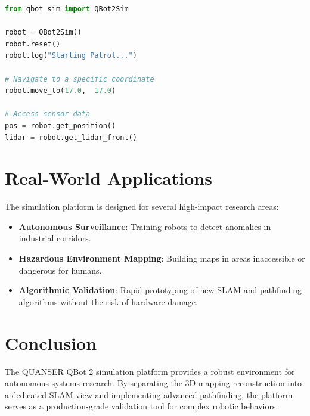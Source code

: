 \documentclass[12pt, a4paper]{article}
\begin{document}
\begin{lstlisting}[language=Python, caption=Sample Control Script]
from qbot_sim import QBot2Sim

robot = QBot2Sim()
robot.reset()
robot.log("Starting Patrol...")

# Navigate to a specific coordinate
robot.move_to(17.0, -17.0) 

# Access sensor data
pos = robot.get_position()
lidar = robot.get_lidar_front()
\end{lstlisting}

\section{Real-World Applications}
The simulation platform is designed for several high-impact research areas:
\begin{itemize}
    \item \textbf{Autonomous Surveillance}: Training robots to detect anomalies in industrial corridors.
    \item \textbf{Hazardous Environment Mapping}: Building maps in areas inaccessible or dangerous for humans.
    \item \textbf{Algorithmic Validation}: Rapid prototyping of new SLAM and pathfinding algorithms without the risk of hardware damage.
\end{itemize}

\section{Conclusion}
The QUANSER QBot 2 simulation platform provides a robust environment for autonomous systems research. By separating the 3D mapping reconstruction into a dedicated SLAM view and implementing advanced pathfinding, the platform serves as a production-grade validation tool for complex robotic behaviors.
\end{document}
